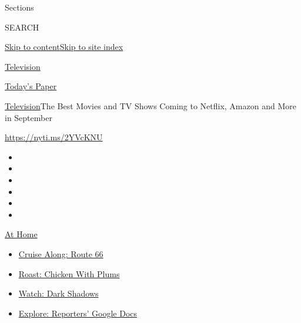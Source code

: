 Sections

SEARCH

\protect\hyperlink{site-content}{Skip to
content}\protect\hyperlink{site-index}{Skip to site index}

\href{https://www.nytimes3xbfgragh.onion/section/arts/television}{Television}

\href{https://myaccount.nytimes3xbfgragh.onion/auth/login?response_type=cookie\&client_id=vi}{}

\href{https://www.nytimes3xbfgragh.onion/section/todayspaper}{Today's
Paper}

\href{/section/arts/television}{Television}\textbar{}The Best Movies and
TV Shows Coming to Netflix, Amazon and More in September

\url{https://nyti.ms/2YVcKNU}

\begin{itemize}
\item
\item
\item
\item
\item
\item
\end{itemize}

\href{https://www.nytimes3xbfgragh.onion/spotlight/at-home?action=click\&pgtype=Article\&state=default\&region=TOP_BANNER\&context=at_home_menu}{At
Home}

\begin{itemize}
\tightlist
\item
  \href{https://www.nytimes3xbfgragh.onion/2020/09/07/travel/route-66.html?action=click\&pgtype=Article\&state=default\&region=TOP_BANNER\&context=at_home_menu}{Cruise
  Along: Route 66}
\item
  \href{https://www.nytimes3xbfgragh.onion/2020/09/04/dining/sheet-pan-chicken.html?action=click\&pgtype=Article\&state=default\&region=TOP_BANNER\&context=at_home_menu}{Roast:
  Chicken With Plums}
\item
  \href{https://www.nytimes3xbfgragh.onion/2020/09/04/arts/television/dark-shadows-stream.html?action=click\&pgtype=Article\&state=default\&region=TOP_BANNER\&context=at_home_menu}{Watch:
  Dark Shadows}
\item
  \href{https://www.nytimes3xbfgragh.onion/interactive/2020/at-home/even-more-reporters-editors-diaries-lists-recommendations.html?action=click\&pgtype=Article\&state=default\&region=TOP_BANNER\&context=at_home_menu}{Explore:
  Reporters' Google Docs}
\end{itemize}

